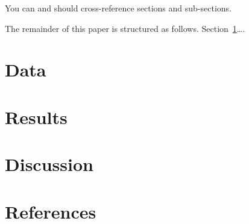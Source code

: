 \documentclass[
  letterpaper,
  DIV=11,
  numbers=noendperiod]{scrartcl}
\begin{document}
You can and should cross-reference sections and sub-sections.

The remainder of this paper is structured as follows.
Section~\ref{sec-data}\ldots.

\hypertarget{sec-data}{%
\section{Data}\label{sec-data}}

\hypertarget{results}{%
\section{Results}\label{results}}

\hypertarget{discussion}{%
\section{Discussion}\label{discussion}}

\newpage

\hypertarget{references}{%
\section{References}\label{references}}
\end{document}
